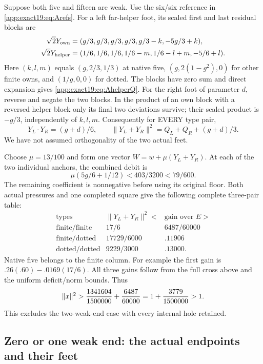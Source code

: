 \documentclass[11pt]{article}
\theoremstyle{definition}
\theoremstyle{remark}
\begin{document}
Suppose both five and fifteen
are weak.
Use the six/six reference in
\eqref{app:exact19:eq:Arefs}.
For a left far-helper foot,
its scaled first and last residual
blocks are
\[
\begin{split}
 \sqrt2Y_{\rm own}&=(g/3,g/3,g/3,g/3,g/3-k,-5g/3+k),\\
 \sqrt2Y_{\rm helper}&=(1/6,1/6,1/6,1/6-m,1/6-l+m,-5/6+l).
\end{split}
\]
Here \((k,l,m)\) equals
\((g,2/3,1/3)\) at native five,
\((g,2(1-g^2),0)\) for other finite
owns, and \((1/g,0,0)\) for dotted.
The blocks have zero sum and
direct expansion gives
\eqref{app:exact19:eq:AhelperQ}.
For the right foot of parameter
\(d\), reverse and negate the two
blocks.
In the product of an own block
with a reversed helper block only
its final two deviations survive;
their scaled product is \(-g/3\),
independently of \(k,l,m\).
Consequently for EVERY type pair,
\[
 Y_L\cdot Y_R=(g+d)/6,\qquad
          \|Y_L+Y_R\|^2=Q_L+Q_R+(g+d)/3 .
\]
We have not assumed orthogonality
of the two actual feet.

Choose \(\mu=13/100\) and form
one vector \(W=w+\mu(Y_L+Y_R)\).
At each of the two individual
anchors, the combined debit is
\[
           \mu(5g/6+1/12)
               <403/3200<79/600 .
\]
The remaining coefficient is
nonnegative before using its
original floor.
Both actual pressures and one
completed square give the following
complete three-pair table:
\[
\begin{array}{c|c|c}
 \text{types}&\|Y_L+Y_R\|^2<&\text{gain over }E>\\ \hline
 \text{finite/finite}&17/6&6487/60000\\
 \text{finite/dotted}&17729/6000&.11906\\
 \text{dotted/dotted}&9229/3000&.13000 .
\end{array}
\]
Native five belongs to the finite
column.
For example the first gain is
\(.26(.60)-.0169(17/6)\).
All three gains follow from the
full cross above and the uniform
deficit/norm bounds.
Thus
\[
            \|x\|^2>
               {1341604\over1500000}+{6487\over60000}
                     =1+{3779\over1500000}>1 .
\]
This excludes the two-weak-end case
with every internal hole retained.

\subsection{Zero or one weak end: the actual endpoints and their feet}
\label{app:exact19:Aactualends}
\end{document}
